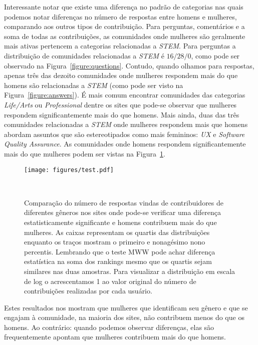 Interessante notar que existe uma diferença no padrão de categorias nas quais podemos notar diferenças no número de respostas entre homens e mulheres, comparando aos outros tipos de contribuição. Para perguntas, comentários e a soma de todas as contribuições, as comunidades onde mulheres são geralmente mais ativas pertencem a categorias relacionadas a \emph{STEM}. Para perguntas a distribuição de comunidades relacionadas a \emph{STEM} é $16/28/0$, como pode ser observado na Figura~\ref{figure:questions}. Contudo, quando olhamos para respostas, apenas três das dezoito comunidades onde mulheres respondem mais do que homens são relacionadas a \emph{STEM} (como pode ser visto na Figura~\ref{figure:answers}). É mais comum encontrar comunidades das categorias \emph{Life/Arts} ou \emph{Professional} dentre os sites que pode-se observar que mulheres respondem significantemente mais do que homens. Mais ainda, duas das três comunidades relacionadas a \emph{STEM} onde mulheres respondem mais que homens abordam assuntos que são estereotipados como mais femininos: \emph{UX} e \textit{Software Quality Assurance}. As comunidades onde homens respondem significantemente mais do que mulheres podem ser vistas na Figura~\ref{figure:answers-men}.

\begin{figure}
  \raggedleft
  \texttt{[image: figures/test.pdf]}
  \caption[Comparação do número de respostas em comunidades onde homens respondem mais.]{Comparação do número de respostas vindas de contribuidores de diferentes gêneros nos sites onde pode-se verificar uma diferença estatisticamente significante e homens contribuem mais do que mulheres. As caixas representam os quartis das distribuições enquanto os traços mostram o primeiro e nonagésimo nono percentis. Lembrando que o teste MWW pode achar diferença estatística na soma dos rankings mesmo que os quartis sejam similares nas duas amostras. Para visualizar a distribuição em escala de log o acrescentamos 1 ao valor original do número de contribuições realizadas por cada usuário. }~\label{figure:answers-men}
\end{figure}


Estes resultados nos mostram que mulheres que identificam seu gênero e que se engajam à comunidade, na maioria dos sites, não contribuem menos do que os homens. Ao contrário: quando podemos observar diferenças, elas são frequentemente apontam que mulheres contribuem mais do que homens.

